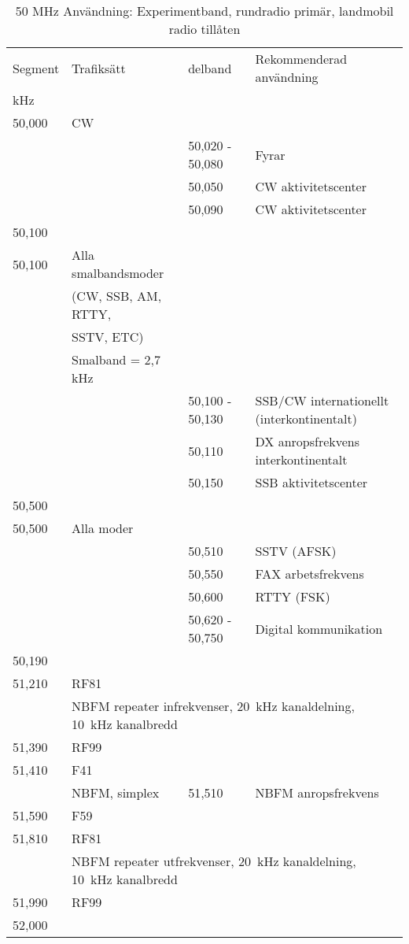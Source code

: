 \setlongtables
\begin{longtable}{llll}
\caption{50 MHz Användning: Experimentband, rundradio primär, landmobil radio tillåten} \\
Segment & Trafiksätt & delband & Rekommenderad användning \\
kHz     &            &         & \\ \hline
\endhead
50,000 & CW &                 & \\
       &    & 50,020 - 50,080 & Fyrar \\
       &    & 50,050          & CW aktivitetscenter \\
       &    & 50,090          & CW aktivitetscenter \\
50,100 &    &                 & \\ \hline

50,100 & Alla smalbandsmoder & & \\
       & (CW, SSB, AM, RTTY, & & \\
       & SSTV, ETC)          & & \\
       & Smalband = 2,7 kHz  & & \\
       &    & 50,100 - 50,130 & SSB/CW internationellt (interkontinentalt) \\
       &    & 50,110          & DX anropsfrekvens interkontinentalt \\
       &    & 50,150          & SSB aktivitetscenter \\
50,500 &    &                 & \\ \hline

50,500 & Alla moder & & \\
       &    & 50,510          & SSTV (AFSK) \\
       &    & 50,550          & FAX arbetsfrekvens \\
       &    & 50,600          & RTTY (FSK) \\
       &    & 50,620 - 50,750 & Digital kommunikation \\
50,190 &    &   & \\ \hline

51,210 & RF81 & & \\
       & \multicolumn{3}{l}{NBFM repeater infrekvenser, 20~kHz kanaldelning, 10~kHz kanalbredd} \\
51,390 & RF99 & & \\ \hline

51,410 & F41 & & \\
       & NBFM, simplex & 51,510 & NBFM anropsfrekvens\\
51,590 & F59 & & \\ \hline

51,810 & RF81 & & \\
       & \multicolumn{3}{l}{NBFM repeater utfrekvenser, 20~kHz kanaldelning, 10~kHz kanalbredd} \\
51,990 & RF99 & & \\
52,000 & & & \\
\end{longtable}

